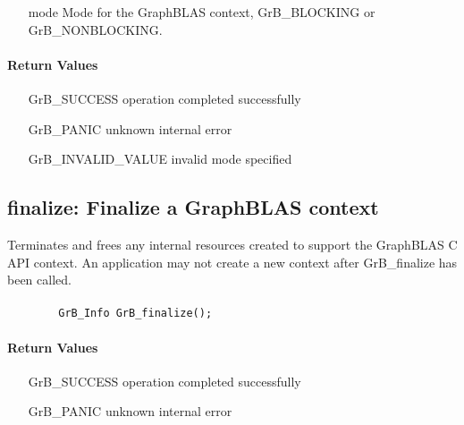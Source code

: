 \begin{itemize}[leftmargin=1.1in]
	\item[{\sf mode}] Mode for the GraphBLAS context, {\sf GrB\_BLOCKING} or {\sf GrB\_NONBLOCKING}.
\end{itemize}

\paragraph{Return Values}


\begin{itemize}[leftmargin=2.1in]
\item[{\sf GrB\_SUCCESS}]           operation completed successfully
\item[{\sf GrB\_PANIC}]             unknown internal error  
\item[{\sf GrB\_INVALID\_VALUE}]    invalid mode specified
\end{itemize}


\subsection{{\sf finalize}: Finalize a GraphBLAS context}

Terminates and frees any internal resources created to 
support the GraphBLAS C API context.
An application may not create a new context after 
{\sf GrB\_finalize} has been called.

\paragraph{\syntax}

\begin{verbatim}
        GrB_Info GrB_finalize();
\end{verbatim}

\paragraph{Return Values}

\begin{itemize}[leftmargin=2.1in]
\item[{\sf GrB\_SUCCESS}]        operation completed successfully
\item[{\sf GrB\_PANIC}]          unknown internal error
\end{itemize}

